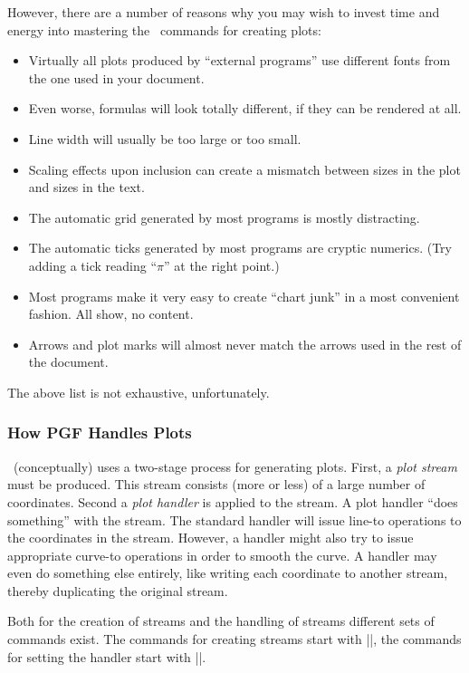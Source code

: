However, there are a number of reasons why you may wish to invest time
and energy into mastering the \pgfname\ commands for creating plots:

\begin{itemize}
\item
  Virtually all plots produced by ``external programs'' use different
  fonts from the one used in your document.
\item
  Even worse, formulas will look totally different, if they can be
  rendered at all.
\item
  Line width will usually be too large or too small.
\item
  Scaling effects upon inclusion can create a mismatch between sizes
  in the plot and sizes in the text.
\item
  The automatic grid generated by most programs is mostly
  distracting. 
\item
  The automatic ticks generated by most programs are cryptic
  numerics. (Try adding a tick reading ``$\pi$'' at the right point.)
\item
  Most programs make it very easy to create ``chart junk'' in a most
  convenient fashion.  All show, no content.
\item
  Arrows and plot marks will almost never match the arrows used in the
  rest of the document.
\end{itemize}

The above list is not exhaustive, unfortunately.


\subsubsection{How PGF Handles Plots}

\pgfname\ (conceptually) uses a two-stage process for generating
plots. First, a \emph{plot stream} must be produced. This stream
consists (more or less) of a large number of coordinates. Second a 
\emph{plot handler} is applied to the stream. A plot handler ``does
something'' with the stream. The standard handler will issue
line-to operations to the coordinates in the stream. However, a
handler might also try to issue appropriate curve-to operations in
order to smooth the curve. A handler may even do something else
entirely, like writing each coordinate to another stream, thereby
duplicating the original stream.

Both for the creation of streams and the handling of streams different
sets of commands exist. The commands for creating streams start with
|\pgfplotstream|, the commands for setting the handler start with
|\pgfplothandler|.



